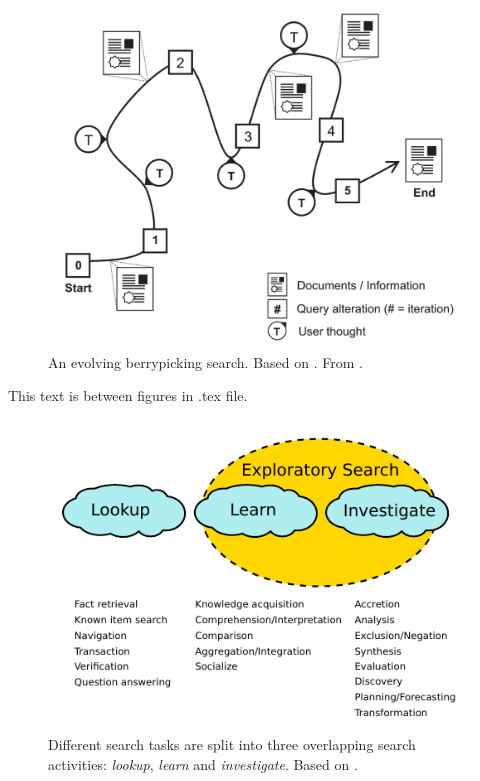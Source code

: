 \begin{figure}[htp] %
\caption{An evolving berrypicking search. Based on \protect\cite{bates89}. From \protect\cite{march06}.}
\label{figure_bp}
\centering
\includegraphics[scale=0.25]{figures/berrypicking.pdf}
\end{figure}

This text is between figures in .tex file.

\begin{figure}[htp] %
\caption{Different search tasks are split into three overlapping search activities: \textit{lookup}, \textit{learn} and \textit{investigate}. Based on \protect\cite{march06}.}
\label{figure_3clouds}
\centering
\includegraphics[scale=1.5]{figures/3clouds.pdf}
\end{figure}

